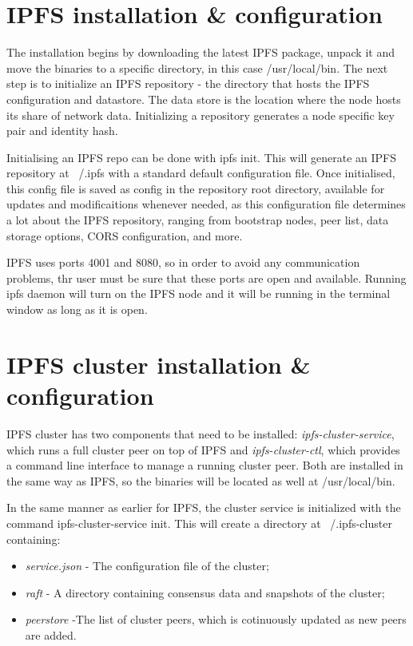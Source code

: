 \documentclass[12pt]{report}
\begin{document}
\pagebreak
% 
% 

\begin{appendices}
\chapter{IPFS installation \& configuration}
\label{apx:ipfs}

The installation begins by downloading the latest IPFS package, unpack it and move the binaries to a specific directory, in this case {\ttfamily\small /usr/local/bin}. The next step is to initialize an IPFS repository - the directory that hosts the IPFS configuration and datastore. The data store is the location where the node hosts its share of network data. Initializing a repository generates a node specific key pair and identity hash.

Initialising an IPFS repo can be done with {\ttfamily\small ipfs init}. This will generate an IPFS repository at {\ttfamily\small ~/.ipfs} with a standard default configuration file. Once initialised, this config file is saved as config in the repository root directory, available for updates and modificaitions whenever needed, as this configuration file determines a lot about the IPFS repository, ranging from bootstrap nodes, peer list, data storage options, CORS configuration, and more.

IPFS uses ports 4001 and 8080, so in order to avoid any communication problems, thr user must be sure that these ports are open and available. Running {\ttfamily\small ipfs daemon} will turn on the IPFS node and it will be running in the terminal window as long as it is open.


\chapter{IPFS cluster installation \& configuration}
\label{apx:ipfscluster}

IPFS cluster has two components that need to be installed: \textit{ipfs-cluster-service}, which runs a full cluster peer on top of IPFS and \textit{ipfs-cluster-ctl}, which provides a command line interface to manage a running cluster peer. Both are installed in the same way as IPFS, so the binaries will be located as well at {\ttfamily\small /usr/local/bin}.

In the same manner as earlier for IPFS, the cluster service is initialized with the command {\ttfamily\small ipfs-cluster-service init}. This will create a directory at {\ttfamily\small ~/.ipfs-cluster} containing: 
\begin{itemize}
\item \textit{service.json} - The configuration file of the cluster;
\item \textit{raft} - A directory containing consensus data and snapshots of the cluster;
\item \textit{peerstore} -The list of cluster peers, which is cotinuously updated as new peers are added.
\end{itemize}


\end{appendices}
\end{document}
